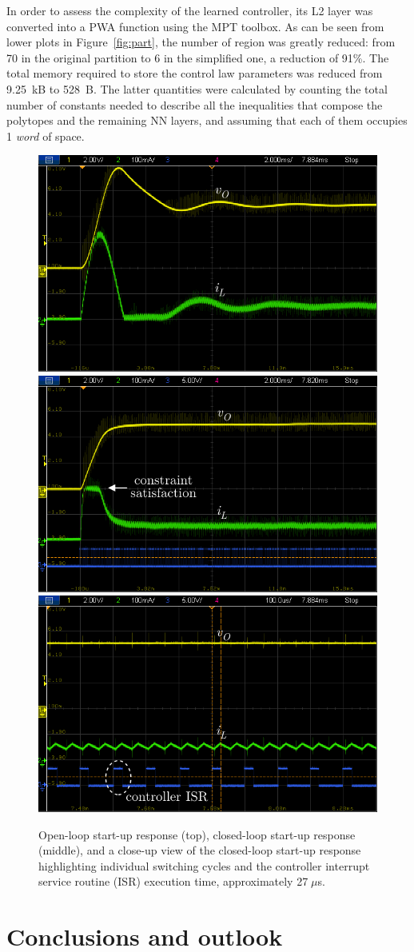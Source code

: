 In order to assess the complexity of the learned controller, its L2 layer was converted into a PWA function using the MPT toolbox. As can be seen from lower plots in Figure~\ref{fig:part}, the number of region was greatly reduced: from 70 in the original partition to 6 in the simplified one, a reduction of 91\%. The total memory required to store the control law parameters was reduced from 9.25~kB to 528~B. The latter quantities were calculated by counting the total number of constants needed to describe all the inequalities that compose the polytopes and the remaining NN layers, and assuming that each of them occupies 1 \textit{word} of space.

\pagebreak

\begin{figure}[p] 
	\vspace*{25pt}
	\centering
	\includegraphics[width=0.65\linewidth]{../images/chap4_scope_ol} \\[10pt]
	\includegraphics[width=0.65\linewidth]{../images/chap4_scope_cl1} \\[10pt]
	\includegraphics[width=0.65\linewidth]{../images/chap4_scope_cl2}
	\caption{Open-loop start-up response (top), closed-loop start-up response (middle), and a close-up view of the closed-loop start-up response highlighting individual switching cycles and the controller interrupt service routine (ISR) execution time, approximately 27$\;\mu$s.}
	\label{fig.asd}
\end{figure}

\clearpage

\section{Conclusions and outlook}